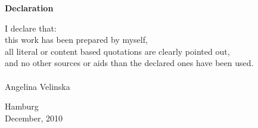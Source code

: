 \bigskip
\bigskip

\pagebreak\par
{\Large\noindent \textbf{Declaration}}\\

\bigskip
\bigskip

\noindent I declare that:\\
this work has been prepared by myself,\\
all literal or content based quotations are clearly pointed out,\\
and no other sources or aids than the declared ones have been used.\\
\vspace{3cm}\\

Angelina Velinska \\
\medskip

Hamburg \\
December, 2010 

\pagebreak 
